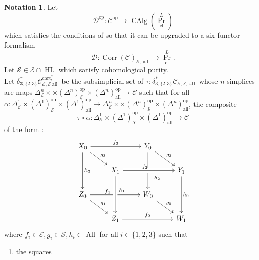 \documentclass[14pt]{article}
\theoremstyle{definition}
\newtheorem{notation}[theorem]{Notation}
\newcommand{\E}{\mathcal{E}}
\newcommand{\D}{\mathcal{D}}
\newcommand{\op}[1]{\operatorname{#1}}
\renewcommand{\S}{\mathcal{S}}
\newcommand{\dd}{\delta}
\newcommand{\Ca}{\mathcal{C}}
\numberwithin{subsection}{section}
\begin{document}
\begin{notation}\label{corrsmoothcategory}
 Let 
 \begin{equation}
    \D^{\op{op}} : \Ca^{\op{op}} \to \op{CAlg}(\op{Pr}^{L}_{\op{cl}})
\end{equation}
which satisfies the conditions of \cite[Theorem 5.2.3]{chowdhury2025sixfunctorformalismsiiiconstruction} so that it can be upgraded to a six-functor formalism 
\begin{equation}
    \D : \op{Corr}(\Ca)_{\E,\op{all}} \to \op{Pr}^L_{\op{cl}}.
\end{equation}
Let $\S \in \E \cap \op{HL}$ which satisfy cohomological purity. \\
   Let  $\delta^*_{3,\{2,3\}}\Ca^{\op{cart}^*_!}_{\E,\S\op{all}}$ be the subsimplicial set  of  $ \tau :\dd^*_{3,\{2,3\}}\Ca_{\E,\S,\op{all}}$ whose $n$-simplices are maps $\Delta^n_{\E} \times \times (\Delta^n)^{\op{op}}_{\S}\times (\Delta^n)_{\op{all}}^{\op{op}} \to \Ca$ such that for all $\alpha:\Delta^1_{\E} \times (\Delta^1)^{\op{op}}_{\S}\times (\Delta^1)_{\op{all}}^{\op{op}}  \to  \Delta^n_{\E} \times \times (\Delta^n)^{\op{op}}_{\S}\times (\Delta^n)_{\op{all}}^{\op{op}} $, the composite  \begin{equation} \tau \circ \alpha : \Delta^1_{\E} \times (\Delta^1)^{\op{op}}_{\S}\times (\Delta^1)_{\op{all}}^{\op{op}} \to \Ca \end{equation} of the form :
\begin{equation}\label{1simplexforDcartuppershriek}
    \begin{tikzcd}
        X_0 \arrow[rr," f_3"] \arrow[dr,"g_3"] \arrow[dd,"h_3"] && Y_0 \arrow[dd,"h_2"{xshift=6pt,yshift=-10pt}] \arrow[dr,"g_2"] & {} \\
        {} & X_1 \arrow[rr,"f_2" {xshift=-5pt},crossing over] \arrow[dd,"h_1" {xshift =3pt, yshift=6pt}] && Y_1 \arrow[dd,"h_0"] \\ 
        Z_0 \arrow[rr,"f_1"{xshift=-10pt,yshift=-1pt}] \arrow[dr,"g_1"] && W_0 \arrow[dr,"g_0"] & {} \\
        {} & Z_1  \arrow[rr,"f_0"] \arrow[from=uu,crossing over] && W_1 
    \end{tikzcd}
\end{equation}
where $f_i \in \E, g_i \in \S, h_i \in \op{All}$ for all $i \in \{1,2,3\}$  
 such that
 \begin{enumerate}
 \item the squares
 \begin{equation}
     \begin{tikzcd}

\end{tikzcd}
\end{equation}
\end{enumerate}
\end{notation}
\end{document}
